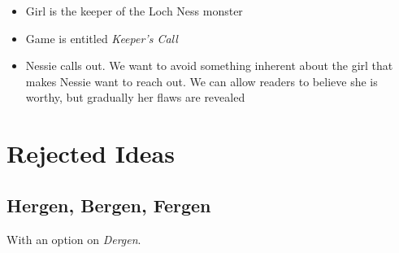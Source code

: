 \documentclass[letterpaper, twoside, 12pt]{memoir}
\begin{document}
\begin{itemize}
\item Girl is the keeper of the Loch Ness monster
\item Game is entitled \textit{Keeper's Call}
\item Nessie calls out. We want to avoid something inherent about the girl that makes Nessie want to reach out. We can allow readers to believe she is worthy, but gradually her flaws are revealed
\end{itemize}

\chapter{Rejected Ideas}

\section{Hergen, Bergen, Fergen}

With an option on \textit{Dergen}. 
\end{document}
